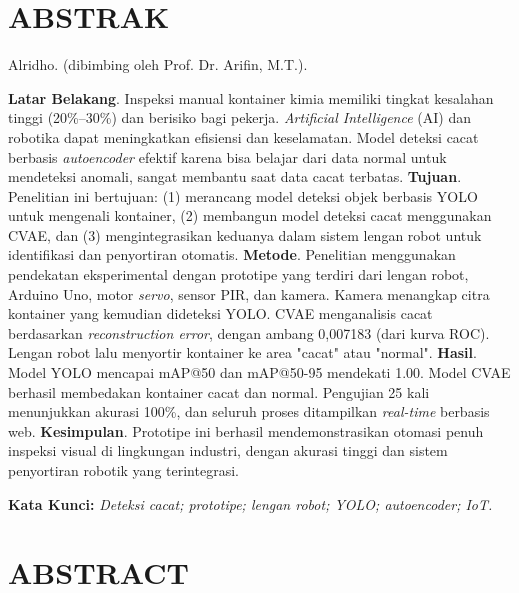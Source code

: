 \begingroup
\singlespacing
\chapter*{ABSTRAK}

\noindent
Alridho. \textbf{\JudulSkripsi} (dibimbing oleh Prof. Dr. Arifin, M.T.). \par

\vspace*{0.1cm}

\noindent
\textbf{Latar Belakang}. Inspeksi manual kontainer kimia memiliki tingkat kesalahan tinggi (20\%–30\%) dan berisiko bagi pekerja. \textit{Artificial Intelligence} (AI) dan robotika dapat meningkatkan efisiensi dan keselamatan. Model deteksi cacat berbasis \textit{autoencoder} efektif karena bisa belajar dari data normal untuk mendeteksi anomali, sangat membantu saat data cacat terbatas. \textbf{Tujuan}. Penelitian ini bertujuan: (1) merancang model deteksi objek berbasis YOLO untuk mengenali kontainer, (2) membangun model deteksi cacat menggunakan CVAE, dan (3) mengintegrasikan keduanya dalam sistem lengan robot untuk identifikasi dan penyortiran otomatis. \textbf{Metode}. Penelitian menggunakan pendekatan eksperimental dengan prototipe yang terdiri dari lengan robot, Arduino Uno, motor \textit{servo}, sensor PIR, dan kamera. Kamera menangkap citra kontainer yang kemudian dideteksi YOLO. CVAE menganalisis cacat berdasarkan \textit{reconstruction error}, dengan ambang 0{,}007183 (dari kurva ROC). Lengan robot lalu menyortir kontainer ke area "cacat" atau "normal". \textbf{Hasil}. Model YOLO mencapai mAP@50 dan mAP@50-95 mendekati 1.00. Model CVAE berhasil membedakan kontainer cacat dan normal. Pengujian 25 kali menunjukkan akurasi 100\%, dan seluruh proses ditampilkan \textit{real-time} berbasis web. \textbf{Kesimpulan}. Prototipe ini berhasil mendemonstrasikan otomasi penuh inspeksi visual di lingkungan industri, dengan akurasi tinggi dan sistem penyortiran robotik yang terintegrasi. \par

\vspace*{0.1cm}

\noindent
\textbf{Kata Kunci:} \textit{Deteksi cacat; prototipe; lengan robot; YOLO; autoencoder; IoT.}

\endgroup

\newpage

\begingroup
\singlespacing
\chapter*{ABSTRACT}

